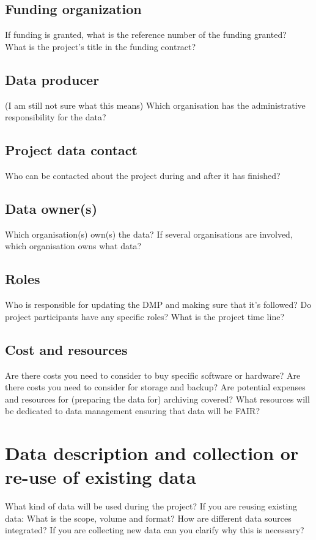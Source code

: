\documentclass[11pt,a4paper]{article}
\begin{document}
	\subsection{Funding organization}
	If funding is granted, what is the reference number of the funding granted?\\
	What is the project’s title in the funding contract?
	
	\subsection{Data producer}
	(I am still not sure what this means)
	Which organisation has the administrative responsibility for the data?
	
	\subsection{Project data contact}
	Who can be contacted about the project during and after it has finished?
	
	\subsection{Data owner(s)}
	Which organisation(s) own(s) the data?
	If several organisations are involved, which organisation owns what data?
	
	\subsection{Roles}
	Who is responsible for updating the DMP and making sure that it’s followed?
	Do project participants have any specific roles?
	What is the project time line?
	
	\subsection{Cost and resources}
	Are there costs you need to consider to buy specific software or hardware?
	Are there costs you need to consider for storage and backup?
	Are potential expenses and resources for (preparing the data for) archiving covered?
	What resources will be dedicated to data management ensuring that data will be FAIR?
	
	\section[data info]{Data description and collection or re-use of existing data}
	What kind of data will be used during the project?
	If you are reusing existing data: What is the scope, volume and format? How are
	different data sources integrated?
	If you are collecting new data can you clarify why this is necessary?
	
\end{document}
